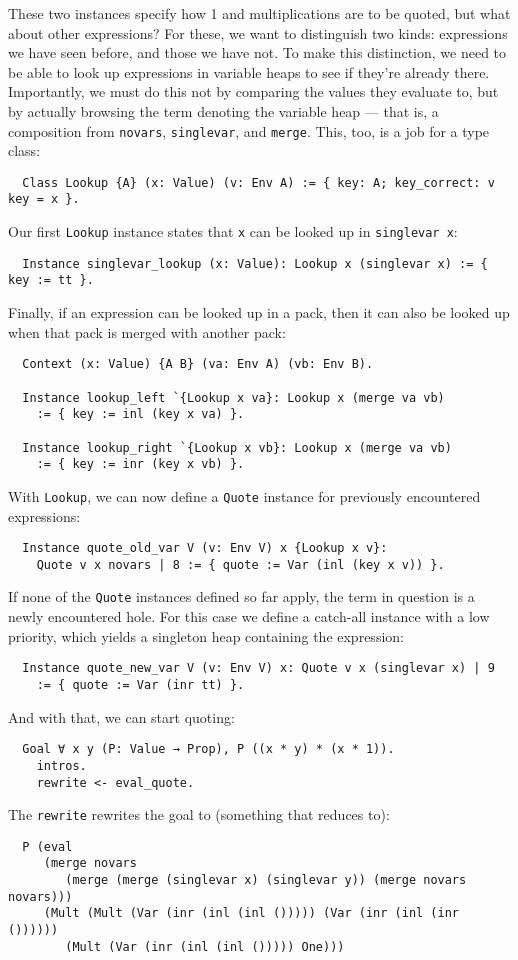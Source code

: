 \documentclass[a4paper,10pt,runningheads]{llncs}
\begin{document}
These two instances specify how 1 and multiplications are to be quoted, but what about other expressions? For these, we want to distinguish two kinds: expressions we have seen before, and those we have not. To make this distinction, we need to be able to look up expressions in variable heaps to see if they're already there. Importantly, we must do this not by comparing the values they evaluate to, but by actually browsing the term denoting the variable heap --- that is, a composition from \lstinline|novars|, \lstinline|singlevar|, and \lstinline|merge|. This, too, is a job for a type class:
\begin{lstlisting}
  Class Lookup {A} (x: Value) (v: Env A) := { key: A; key_correct: v key = x }.
\end{lstlisting}
Our first \lstinline|Lookup| instance states that \lstinline|x| can be looked up in \lstinline|singlevar x|:
\begin{lstlisting}
  Instance singlevar_lookup (x: Value): Lookup x (singlevar x) := { key := tt }.
\end{lstlisting}
Finally, if an expression can be looked up in a pack, then it can also be looked up when that pack is merged with another pack:
\begin{lstlisting}
  Context (x: Value) {A B} (va: Env A) (vb: Env B).

  Instance lookup_left `{Lookup x va}: Lookup x (merge va vb)
    := { key := inl (key x va) }.

  Instance lookup_right `{Lookup x vb}: Lookup x (merge va vb)
    := { key := inr (key x vb) }.
\end{lstlisting}

With \lstinline|Lookup|, we can now define a \lstinline|Quote| instance for previously encountered expressions:
\begin{lstlisting}
  Instance quote_old_var V (v: Env V) x {Lookup x v}:
    Quote v x novars | 8 := { quote := Var (inl (key x v)) }.
\end{lstlisting}

If none of the \lstinline|Quote| instances defined so far apply, the term in question is a newly encountered hole. For this case we define a catch-all instance with a low priority, which yields a singleton heap containing the expression:
\begin{lstlisting}
  Instance quote_new_var V (v: Env V) x: Quote v x (singlevar x) | 9
    := { quote := Var (inr tt) }.
\end{lstlisting}
And with that, we can start quoting:
\begin{lstlisting}
  Goal ∀ x y (P: Value → Prop), P ((x * y) * (x * 1)).
    intros.
    rewrite <- eval_quote.
\end{lstlisting}
The \lstinline|rewrite| rewrites the goal to (something that reduces to):
\begin{lstlisting}
  P (eval
     (merge novars
        (merge (merge (singlevar x) (singlevar y)) (merge novars novars)))
     (Mult (Mult (Var (inr (inl (inl ())))) (Var (inr (inl (inr ())))))
        (Mult (Var (inr (inl (inl ())))) One)))
\end{lstlisting}
\end{document}
